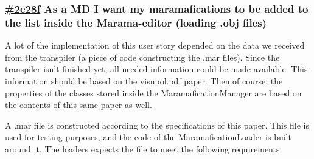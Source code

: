 \documentclass[10pt]{extarticle} %
\begin{document}
    \newcommand{\clickup}[1]{https://app.clickup.com/757520/761304/t/#1}

    \subsubsection{\href{\clickup{2e28f}}{\#2e28f} As a MD I want my maramafications to be added to the list inside the Marama-editor (loading .obj files)}
    A lot of the implementation of this user story depended on the data we received from the transpiler\cite{transp} (a piece of code constructing the .mar files).
    Since the transpiler isn't finished yet, all needed information could be made available.
    This information should be based on the visupol.pdf\cite{visupol} paper.
    Then of course, the properties of the classes stored inside the MaramaficationManager are based on the contents of this same paper as well.

    A .mar file is constructed according to the specifications of this paper.
    This file is used for testing purposes, and the code of the MaramaficationLoader is built around it.
    The loaders expects the file to meet the following requirements:
\end{document}
